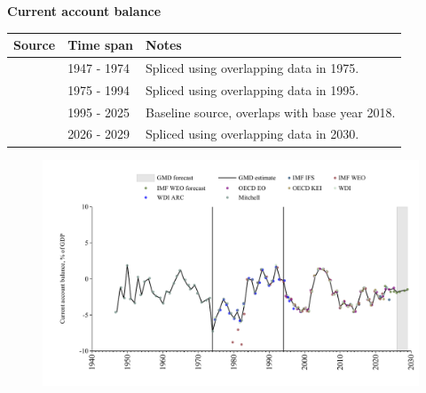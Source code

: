 \documentclass[12pt,a4paper,landscape]{article}
\begin{document}
\begin{adjustbox}{max totalsize={\paperwidth}{\paperheight},center}
\begin{minipage}[t][\textheight][t]{\textwidth}
\vspace*{0.5cm}
{}
\begin{center}
{\Large\bfseries Current account balance}
\end{center}
\vspace{0.5cm}
\begin{table}[H]
\centering
\small
\begin{tabular}{|l|l|l|}
\hline
\textbf{Source} & \textbf{Time span} & \textbf{Notes} \\
\hline
\rowcolor{white}\cite{Mitchell}& 1947 - 1974 &Spliced using overlapping data in 1975. \\
\rowcolor{lightgray}\cite{WDI}& 1975 - 1994 &Spliced using overlapping data in 1995. \\
\rowcolor{white}\cite{OECD_EO}& 1995 - 2025 &Baseline source, overlaps with base year 2018. \\
\rowcolor{lightgray}\cite{IMF_WEO_forecast}& 2026 - 2029 &Spliced using overlapping data in 2030. \\
\hline
\end{tabular}
\end{table}
\begin{figure}[H]
\centering
\includegraphics[width=\textwidth,height=0.6\textheight,keepaspectratio]{graphs/BRA_CA_GDP.pdf}
\end{figure}
\end{minipage}
\end{adjustbox}
\end{document}
